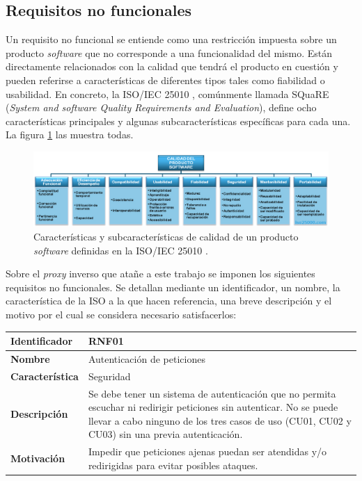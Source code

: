 \documentclass[11pt,spanish,listoffigures]{tfgetsinf}
\begin{document}

		\subsection{Requisitos no funcionales} \label{requisitosNoFuncionales}
		
Un requisito no funcional se entiende como una restricción impuesta sobre un producto \emph{software} que no corresponde a una funcionalidad del mismo. Están directamente relacionados con la calidad que tendrá el producto en cuestión y pueden referirse a características de diferentes tipos tales como fiabilidad o usabilidad. En concreto, la ISO/IEC 25010 \cite{ISO25010}, comúnmente llamada SQuaRE (\emph{System and software Quality Requirements and Evaluation}), define ocho características principales y algunas subcaracterísticas específicas para cada una. La figura \ref{iso25010} las muestra todas.

\begin{figure}[ht]
\centering
\includegraphics[width=1\textwidth]{imagenes/iso25010}
\caption[Características y subcaracterísticas de calidad de un producto \emph{software} definidas en la ISO/IEC 25010.]{Características y subcaracterísticas de calidad de un producto \emph{software} definidas en la ISO/IEC 25010 \cite{ISO25010}.}
	\label{iso25010}
\end{figure}

Sobre el \emph{proxy} inverso que atañe a este trabajo se imponen los siguientes requisitos no funcionales. Se detallan mediante un identificador, un nombre, la característica de la ISO a la que hacen referencia, una breve descripción y el motivo por el cual se considera necesario satisfacerlos:

\begin{center} \begin{tabular}{| l | p{11.3cm} |}
\hline
\textbf{Identificador} & RNF01
\\ \hline
\textbf{Nombre} & Autenticación de peticiones
\\ \hline
\textbf{Característica} & Seguridad
\\ \hline
\textbf{Descripción} & Se debe tener un sistema de autenticación que no permita escuchar ni redirigir peticiones sin autenticar. No se puede llevar a cabo ninguno de los tres casos de uso (CU01, CU02 y CU03) sin una previa autenticación.
\\ \hline
\textbf{Motivación} & Impedir que peticiones ajenas puedan ser atendidas y/o redirigidas para evitar posibles ataques.
\\ \hline \end{tabular} \end{center}
\end{document}
